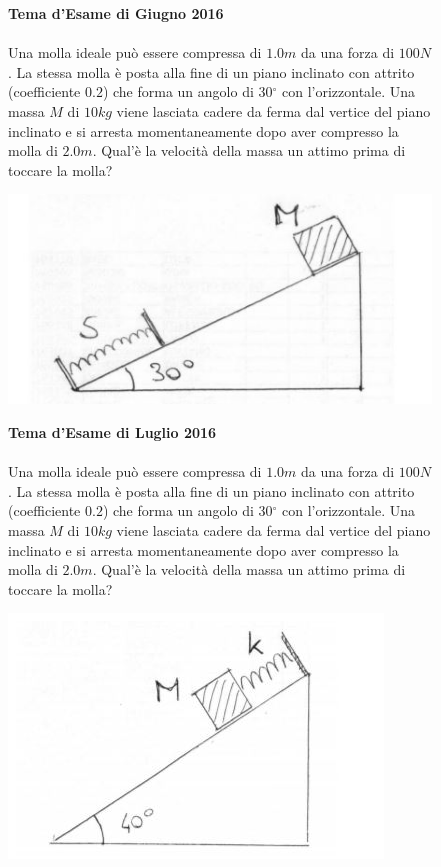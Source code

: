 \begin{figure}[h!]
\textbf{Tema d'Esame di Giugno 2016}\\ \\
Una molla ideale può essere compressa di $1.0 m$ da una forza di $100 N$. La stessa molla è posta alla fine di un piano inclinato con attrito (coefficiente $0.2$) che forma un angolo di 30$^{\circ}$ con l'orizzontale. Una massa $M$ di $10 kg$ viene lasciata cadere da ferma dal vertice del piano inclinato e si arresta momentaneamente dopo aver compresso la molla di $2.0 m$. Qual'è la velocità della massa un attimo prima di toccare la molla? 
\\
	\begin{center}
		\includegraphics[scale=0.5]{ES2/GIU022016.jpg}
	\end{center}
\end{figure}

\begin{figure}[h!]
\textbf{Tema d'Esame di Luglio 2016}\\ \\
Una molla ideale può essere compressa di $1.0 m$ da una forza di $100 N$. La stessa molla è posta alla fine di un piano inclinato con attrito (coefficiente $0.2$) che forma un angolo di 30$^{\circ}$ con l'orizzontale. Una massa $M$ di $10 kg$ viene lasciata cadere da ferma dal vertice del piano inclinato e si arresta momentaneamente dopo aver compresso la molla di $2.0 m$. Qual'è la velocità della massa un attimo prima di toccare la molla? 
\\
	\begin{center}
		\includegraphics[scale=0.5]{ES2/LUG022016.jpg}
	\end{center}
\end{figure}

